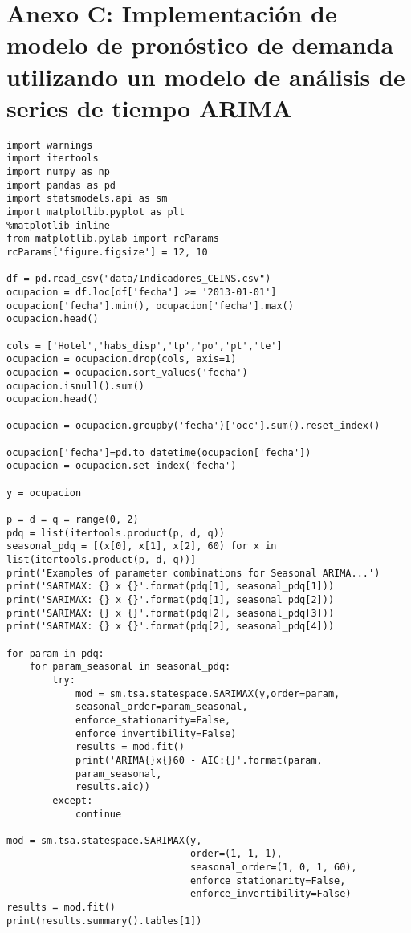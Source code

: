 \chapter{Anexo C: Implementación de modelo de pronóstico de demanda utilizando un modelo de análisis de series de tiempo ARIMA}
\label{ch:anexoa¡c}

\begin{verbatim}
import warnings
import itertools
import numpy as np
import pandas as pd
import statsmodels.api as sm
import matplotlib.pyplot as plt
%matplotlib inline
from matplotlib.pylab import rcParams
rcParams['figure.figsize'] = 12, 10

df = pd.read_csv("data/Indicadores_CEINS.csv")
ocupacion = df.loc[df['fecha'] >= '2013-01-01']
ocupacion['fecha'].min(), ocupacion['fecha'].max()
ocupacion.head()

cols = ['Hotel','habs_disp','tp','po','pt','te']
ocupacion = ocupacion.drop(cols, axis=1)
ocupacion = ocupacion.sort_values('fecha')
ocupacion.isnull().sum()
ocupacion.head()

ocupacion = ocupacion.groupby('fecha')['occ'].sum().reset_index()

ocupacion['fecha']=pd.to_datetime(ocupacion['fecha'])
ocupacion = ocupacion.set_index('fecha')

y = ocupacion

p = d = q = range(0, 2)
pdq = list(itertools.product(p, d, q))
seasonal_pdq = [(x[0], x[1], x[2], 60) for x in list(itertools.product(p, d, q))]
print('Examples of parameter combinations for Seasonal ARIMA...')
print('SARIMAX: {} x {}'.format(pdq[1], seasonal_pdq[1]))
print('SARIMAX: {} x {}'.format(pdq[1], seasonal_pdq[2]))
print('SARIMAX: {} x {}'.format(pdq[2], seasonal_pdq[3]))
print('SARIMAX: {} x {}'.format(pdq[2], seasonal_pdq[4]))

for param in pdq:
    for param_seasonal in seasonal_pdq:
        try:
            mod = sm.tsa.statespace.SARIMAX(y,order=param,
            seasonal_order=param_seasonal,
            enforce_stationarity=False,
            enforce_invertibility=False)
            results = mod.fit()
            print('ARIMA{}x{}60 - AIC:{}'.format(param, 
            param_seasonal, 
            results.aic))
        except:
            continue
            
mod = sm.tsa.statespace.SARIMAX(y,
                                order=(1, 1, 1),
                                seasonal_order=(1, 0, 1, 60),
                                enforce_stationarity=False,
                                enforce_invertibility=False)
results = mod.fit()
print(results.summary().tables[1])


\end{verbatim}
